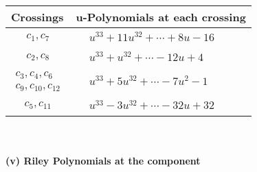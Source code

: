 \documentclass[1p]{elsarticle_modified}
\theoremstyle{definition}
\begin{document}
\begin{tabular}{m{50pt}|m{274pt}}
Crossings & \hspace{64pt}u-Polynomials at each crossing \\
\hline $$\begin{aligned}c_{1},c_{7}\end{aligned}$$&$\begin{aligned}
&u^{33}+11 u^{32}+\cdots+8 u-16
\end{aligned}$\\
\hline $$\begin{aligned}c_{2},c_{8}\end{aligned}$$&$\begin{aligned}
&u^{33}+u^{32}+\cdots-12 u+4
\end{aligned}$\\
\hline $$\begin{aligned}c_{3},c_{4},c_{6}\\c_{9},c_{10},c_{12}\end{aligned}$$&$\begin{aligned}
&u^{33}+5 u^{32}+\cdots-7 u^2-1
\end{aligned}$\\
\hline $$\begin{aligned}c_{5},c_{11}\end{aligned}$$&$\begin{aligned}
&u^{33}-3 u^{32}+\cdots-32 u+32
\end{aligned}$\\
\hline
\end{tabular}\\~\\
\newpage\renewcommand{\arraystretch}{1}
\flushleft \textbf{(v) Riley Polynomials at the component}\newline \\
\end{document}
